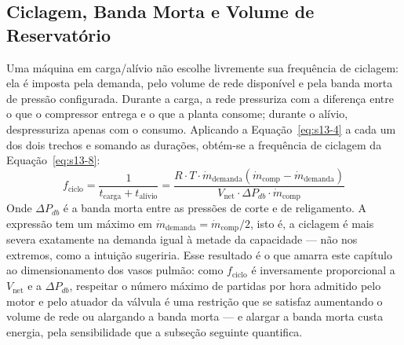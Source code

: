 \documentclass[12pt,a4paper]{article}
\numberwithin{equation}{section}
\numberwithin{table}{section}
\numberwithin{figure}{section}
\begin{document}
	\subsection{\textbf{Ciclagem, Banda Morta e Volume de Reservatório}}
	Uma máquina em carga/alívio não escolhe livremente sua frequência de ciclagem: ela é imposta pela demanda, pelo volume de rede disponível e pela banda morta de pressão configurada. Durante a carga, a rede pressuriza com a diferença entre o que o compressor entrega e o que a planta consome; durante o alívio, despressuriza apenas com o consumo. Aplicando a Equação~\eqref{eq:s13-4} a cada um dos dois trechos e somando as durações, obtém-se a frequência de ciclagem da Equação~\eqref{eq:s13-8}:
	\begin{equation}\label{eq:s13-8}
	f_{\text{ciclo}} = \frac{1}{t_{\text{carga}} + t_{\text{alívio}}} = \frac{R \cdot T \cdot \dot{m}_{\text{demanda}} \left( \dot{m}_{\text{comp}} - \dot{m}_{\text{demanda}} \right)}{V_{\text{net}} \cdot \Delta P_{db} \cdot \dot{m}_{\text{comp}}}
	\end{equation}
	Onde $\Delta P_{db}$ é a banda morta entre as pressões de corte e de religamento. A expressão tem um máximo em $\dot{m}_{\text{demanda}} = \dot{m}_{\text{comp}}/2$, isto é, a ciclagem é mais severa exatamente na demanda igual à metade da capacidade — não nos extremos, como a intuição sugeriria. Esse resultado é o que amarra este capítulo ao dimensionamento dos vasos pulmão: como $f_{\text{ciclo}}$ é inversamente proporcional a $V_{\text{net}}$ e a $\Delta P_{db}$, respeitar o número máximo de partidas por hora admitido pelo motor e pelo atuador da válvula é uma restrição que se satisfaz aumentando o volume de rede ou alargando a banda morta — e alargar a banda morta custa energia, pela sensibilidade que a subseção seguinte quantifica.
\end{document}
